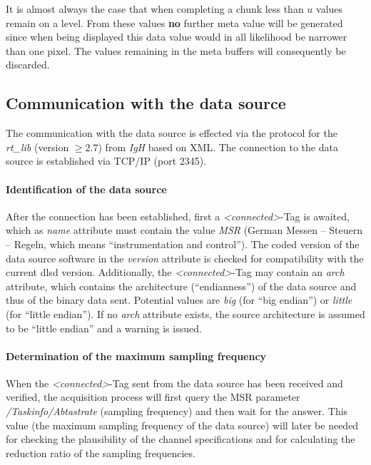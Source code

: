 \documentclass[a4paper,12pt,BCOR6mm,bibtotoc,idxtotoc]{scrbook}
\begin{document}
It is almost always the case that when completing a chunk less
than $u$ values remain on a level. From these values \textbf{no} further meta
value will be generated since when being displayed this data value would in
all likelihood be narrower than one pixel. The values remaining in the meta
buffers will consequently be discarded.


\subsection{Communication with the data source}
\label{sec:dlsd_logger_comm}

The communication with the data source is effected via the protocol for the
\textit{rt\_lib} (version \textit{$\ge 2.7$}) from \textit{IgH} based on
XML. The connection to the data source is established via TCP/IP
(port 2345).

\paragraph{Identification of the data source} After the connection has been
established, first a \textit{\textless connected\textgreater}-Tag is awaited,
which as \textit{name} attribute must contain the value \textit{MSR} (German
\glqq Messen -- Steuern -- Regeln\grqq, which means ``instrumentation and
control''). The coded version of the data source software in the
\textit{version} attribute is checked for compatibility with the current dlsd
version. Additionally, the \textit{\textless connected\textgreater}-Tag may
contain an \textit{arch} attribute, which contains the architecture
(``endianness'') of the data source and thus of the binary
data sent. Potential values are \textit{big} (for ``big endian'') or
\textit{little} (for ``little endian''). If no \textit{arch} attribute exists,
the source architecture is assumed to be ``little endian'' and a warning is
issued.

\paragraph{Determination of the maximum sampling frequency} When the
\textit{\textless connected\textgreater}-Tag sent from the data source has
been received and verified, the acquisition process will first query the MSR
parameter \textit{/Taskinfo/Abtastrate} (sampling frequency) and then wait for
the answer. This value (the maximum sampling frequency of the data source)
will later be needed for checking the plausibility of the channel
specifications and for calculating the reduction ratio of the sampling
frequencies.
\end{document}
